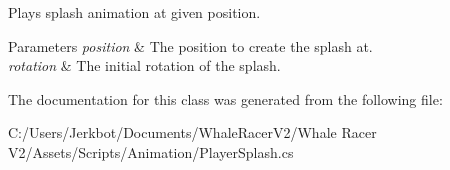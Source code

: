 Plays splash animation at given position. 
\begin{DoxyParams}{Parameters}
{\em position} & The position to create the splash at.\\
\hline
{\em rotation} & The initial rotation of the splash.\\
\hline
\end{DoxyParams}




The documentation for this class was generated from the following file\+:\begin{DoxyCompactItemize}
\item 
C\+:/\+Users/\+Jerkbot/\+Documents/\+Whale\+Racer\+V2/\+Whale Racer V2/\+Assets/\+Scripts/\+Animation/Player\+Splash.\+cs\end{DoxyCompactItemize}
